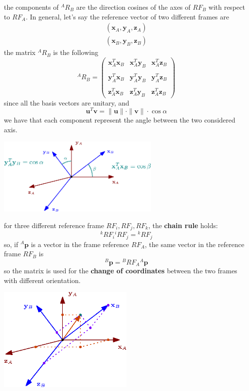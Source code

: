 \documentclass[10pt, letterpaper]{report}
\begin{document}
the components of ${}^AR_B$ are the direction cosines of the axes of $RF_B$ with respect to $RF_A$. In general, let's say the reference vector of two different frames are\begin{align}
    (\mathbf x_A,\mathbf y_A,\mathbf z_A)\\
    (\mathbf x_B,\mathbf y_B,\mathbf z_B)
\end{align}
the matrix ${}^AR_B$ is the following\begin{equation}
    {}^AR_B=\begin{pmatrix}
        \mathbf x^T_A\mathbf x_B&\mathbf x^T_A\mathbf y_B&\mathbf x^T_A\mathbf z_B\\ \\
        \mathbf y^T_A\mathbf x_B&\mathbf y^T_A\mathbf y_B&\mathbf y^T_A\mathbf z_B\\ \\
        \mathbf z^T_A\mathbf x_B&\mathbf z^T_A\mathbf y_B&\mathbf z^T_A\mathbf z_B
    \end{pmatrix}
\end{equation}
since all the basis vectors are unitary, and\begin{equation}
    \mathbf u^T\mathbf v=\|\mathbf u\|\cdot\|\mathbf v\|\cdot\cos\alpha
\end{equation}
we have that each component represent the angle between the two considered axis.
\begin{center}
    \includegraphics[width=0.6\textwidth ]{images/orientation_reference.eps}
\end{center}
for three different reference frame $RF_i,RF_j,RF_k$, the \textbf{chain rule} holds:\begin{equation}
    {}^kRF_i{}^iRF_j={}^kRF_j
\end{equation}
so, if ${}^A\mathbf p$ is a vector in the frame reference $RF_A$, the same vector in the reference frame $RF_B$ is\begin{equation}
    {}^B\mathbf p={}^BRF_A{}^A\mathbf p
\end{equation}
so the matrix is used for the \textbf{change of coordinates} between the two frames with different orientation.\begin{center}
    \includegraphics[width=0.5\textwidth ]{images/coordinate_change.eps}
\end{center}
\end{document}

